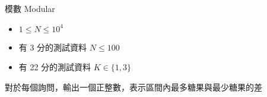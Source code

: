 \begin{problem}{模數 Modular}
\begin{iofmt}
\begin{itemize}
	\item $1 \leq N \leq 10^4$
	\item 有 3 分的測試資料 $N \leq 100$
	\item 有 22 分的測試資料 $K \in \{1,3\}$
\end{itemize}
\end{iofmt}

\OutputFile

對於每個詢問，輸出一個正整數，表示區間內最多糖果與最少糖果的差

\Examples

\begin{example}
\end{example}

\end{problem}
